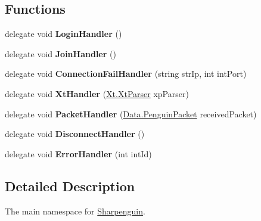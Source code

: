 \subsection*{Functions}
\begin{DoxyCompactItemize}
\item 
\hypertarget{namespaceSharpenguin_a3fe182151524c2bb5fac5bc386a00958}{delegate void {\bfseries Login\-Handler} ()}\label{namespaceSharpenguin_a3fe182151524c2bb5fac5bc386a00958}

\item 
\hypertarget{namespaceSharpenguin_a5ba375cdd84112abe9c2a5c1ea431730}{delegate void {\bfseries Join\-Handler} ()}\label{namespaceSharpenguin_a5ba375cdd84112abe9c2a5c1ea431730}

\item 
\hypertarget{namespaceSharpenguin_aac9861f4e28dcf1d91190fbc8bb3a34a}{delegate void {\bfseries Connection\-Fail\-Handler} (string str\-Ip, int int\-Port)}\label{namespaceSharpenguin_aac9861f4e28dcf1d91190fbc8bb3a34a}

\item 
\hypertarget{namespaceSharpenguin_aabe05957554f393f8ac42f3638fbe3d2}{delegate void {\bfseries Xt\-Handler} (\hyperlink{classSharpenguin_1_1Xt_1_1XtParser}{Xt.\-Xt\-Parser} xp\-Parser)}\label{namespaceSharpenguin_aabe05957554f393f8ac42f3638fbe3d2}

\item 
\hypertarget{namespaceSharpenguin_ab8e8d3abbe4092eff0a110543db5d61f}{delegate void {\bfseries Packet\-Handler} (\hyperlink{classSharpenguin_1_1Data_1_1PenguinPacket}{Data.\-Penguin\-Packet} received\-Packet)}\label{namespaceSharpenguin_ab8e8d3abbe4092eff0a110543db5d61f}

\item 
\hypertarget{namespaceSharpenguin_a67fd56044a18342181ce6f25b81ee93e}{delegate void {\bfseries Disconnect\-Handler} ()}\label{namespaceSharpenguin_a67fd56044a18342181ce6f25b81ee93e}

\item 
\hypertarget{namespaceSharpenguin_aad92c96a7e3460249d9a403dee76dc69}{delegate void {\bfseries Error\-Handler} (int int\-Id)}\label{namespaceSharpenguin_aad92c96a7e3460249d9a403dee76dc69}

\end{DoxyCompactItemize}


\subsection{Detailed Description}
The main namespace for \hyperlink{namespaceSharpenguin}{Sharpenguin}. 
